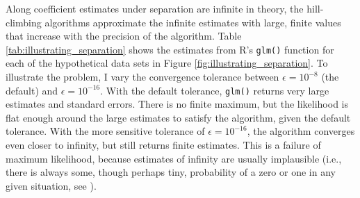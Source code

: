 \documentclass[12pt]{article}
\begin{document}
Along coefficient estimates under separation are infinite in theory, the hill-climbing algorithms approximate the infinite estimates with large, finite values that increase with the precision of the algorithm. Table \ref{tab:illustrating_separation} shows the estimates from R's \texttt{glm()} function for each of the hypothetical data sets in Figure \ref{fig:illustrating_separation}. To illustrate the problem, I vary the convergence tolerance between $\epsilon = 10^{-8}$ (the default) and $\epsilon = 10^{-16}$. With the default tolerance, \texttt{glm()} returns very large estimates and standard errors. There is no finite maximum, but the likelihood is flat enough around the large estimates to satisfy the algorithm, given the default tolerance. With the more sensitive tolerance of $\epsilon = 10^{-16}$, the algorithm converges even closer to infinity, but still returns finite estimates. This is a failure of maximum likelihood, because estimates of infinity are usually implausible (i.e., there is always some, though perhaps tiny, probability of a zero or one in any given situation, see \citealt{HeinzeSchemper2002}). 
\end{document}
